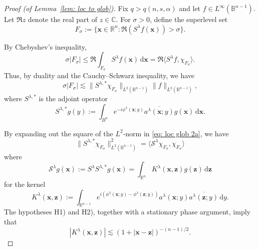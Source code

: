 \documentclass[reqno]{amsart}
\numberwithin{equation}{section}
\newcommand{\B}{\mathbb{B}}
\newcommand{\C}{\mathbb{C}}
\newcommand{\R}{\mathbb{R}}
\newcommand{\cS}{\mathcal{S}}
\newcommand{\ud}{\mathrm{d}}
\newcommand{\bx}{\mathbf{x}}
\newcommand{\bz}{\mathbf{z}}
\newcommand{\fR}{\mathfrak{R}}
\def\inn#1#2{\langle#1,#2\rangle}
\theoremstyle{plain}
\theoremstyle{definition}
\begin{document}
\begin{proof}[Proof (of Lemma~\ref{lem: loc to glob})] Fix $q > q(n, s, \alpha)$ and let $f \in  L^{\infty}(\B^{n-1})$. Let $\fR z$ denote the real part of $z \in \C$. For $\sigma > 0$, define the superlevel set
\begin{equation*}
    F_{\sigma} := \big\{ \bx \in \R^n : \fR(S^{\lambda}f(\bx)) > \sigma\big\}.
\end{equation*}

By Chebyshev's inequality,
\begin{equation*}
    \sigma|F_{\sigma}| \leq \fR \int_{F_{\sigma}} S^{\lambda}f(\bx)\,\ud \bx = \fR\inn{S^{\lambda}f}{\chi_{F_{\sigma}}}.
\end{equation*}
Thus, by duality and the Cauchy--Schwarz inequality, we have
\begin{equation}\label{eq: loc glob 2a}
    \sigma|F_{\sigma}| \lesssim \|S^{\lambda, *} \chi_{F_{\sigma}}\|_{L^2(\B^{n-1})}\|f\|_{L^2(\B^{n-1})},
\end{equation}
where $S^{\lambda, *}$ is the adjoint operator
\begin{equation*}
   S^{\lambda, *}g(y) :=  \int_{B^n} e^{-i \phi^{\lambda}(\bx; y)}\overline{a^{\lambda}(\bx;y)} g(\bx)\,\ud \bx .
\end{equation*}

By expanding out the square of the $L^2$-norm in \eqref{eq: loc glob 2a}, we have
\begin{equation*}
   \|S^{\lambda, *}\chi_{F_{\sigma}}\|_{L^2(\B^{n-1})}^2 = \inn{\cS^{\lambda}\chi_{F_{\sigma}}}{\chi_{F_{\sigma}}}
\end{equation*}
where
\begin{equation*}
 \cS^{\lambda}g(\bx) := S^{\lambda}S^{\lambda, *}g(\bx) = \int_{\R^n} K^{\lambda}(\bx,\bz) g(\bz)\,\ud \bz  
\end{equation*}
for the kernel 
\begin{equation*}
    K^{\lambda}(\bx,\bz) := \int_{\R^{n-1}} e^{i(\phi^{\lambda}(\bx;y) - \phi^{\lambda}(\bz;y))} a^{\lambda}(\bx;y) \overline{a^{\lambda}(\bz;y)}\,\ud y.
\end{equation*}
The hypotheses H1) and H2), together with a stationary phase argument, imply that
\begin{equation}\label{eq: loc glob 1}
    |K^{\lambda}(\bx,\bz)| \lesssim (1 + |\bx - \bz|)^{-(n-1)/2}.
\end{equation}


\end{proof}
\end{document}
